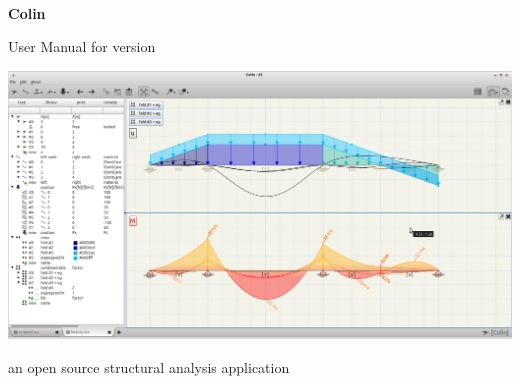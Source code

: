 \begin{titlepage}

\begin{center}
\ \\
\vspace{100pt}
\Huge{\textbf{Colin}}

\Large{User Manual for version }

\vspace{100pt}
\includegraphics[width=\textwidth]{../pictures/title.png}
\end{center}
\vspace{40pt}
\begin{center}
\large{an open source structural analysis application}
\end{center}

\end{titlepage}
\clearpage
